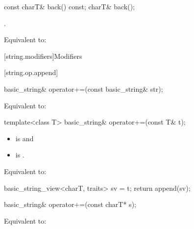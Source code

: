 %
\begin{itemdecl}
const charT& back() const;
charT& back();
\end{itemdecl}

\begin{itemdescr}
\pnum
\expects
{}.

\pnum
\effects
Equivalent to: 
\end{itemdescr}

[string.modifiers]{Modifiers}

[string.op.append]{}

%
\begin{itemdecl}
basic_string& operator+=(const basic_string& str);
\end{itemdecl}

\begin{itemdescr}
\pnum
\effects Equivalent to: 


\end{itemdescr}

%
\begin{itemdecl}
template<class T>
  basic_string& operator+=(const T& t);
\end{itemdecl}

\begin{itemdescr}
\pnum
\constraints
\begin{itemize}
\item
{} is
 and
\item
{} is
.
\end{itemize}

\pnum
\effects
Equivalent to:
\begin{codeblock}
basic_string_view<charT, traits> sv = t;
return append(sv);
\end{codeblock}
\end{itemdescr}

%
\begin{itemdecl}
basic_string& operator+=(const charT* s);
\end{itemdecl}

\begin{itemdescr}
\pnum
\effects Equivalent to: 
\end{itemdescr}

